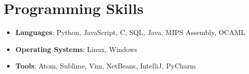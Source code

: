 \documentclass[letterpaper,12pt]{article}
\newcommand{\resumeItem}[2]{
  \item\small{
    \textbf{#1}{: #2 \vspace{-2pt}}
  }
}
\newcommand{\resumeSubItem}[2]{\resumeItem{#1}{#2}\vspace{-4pt}}
\newcommand{\resumeSubHeadingListStart}{\begin{itemize}[leftmargin=*]}
\newcommand{\resumeSubHeadingListEnd}{\end{itemize}}
\begin{document}
\section{Programming Skills}
  \resumeSubHeadingListStart
    \resumeSubItem{Languages}
      {Python, JavaScript, C, SQL, Java, MIPS Assembly, OCAML}
    \resumeSubItem{Operating Systems}
    {Linux, Windows}
    \resumeSubItem{Tools}
    {Atom, Sublime, Vim, NetBeans, IntelliJ, PyCharm}
  \resumeSubHeadingListEnd


\end{document}
